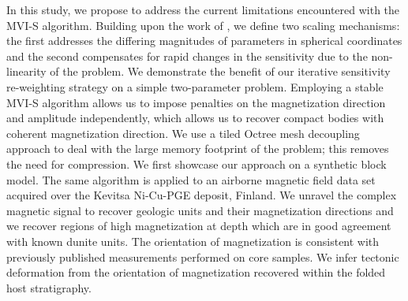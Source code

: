 \documentclass[paper]{geophysics}
\begin{document}
In this study, we propose to address the current limitations encountered with the MVI-S algorithm. Building upon the work of \cite{Liu2017}, we define two scaling mechanisms: the first addresses the differing magnitudes of parameters in spherical coordinates and the second compensates for rapid changes in the sensitivity due to the non-linearity of the problem. We demonstrate the benefit of our iterative sensitivity re-weighting strategy on a simple two-parameter problem. Employing a stable MVI-S algorithm allows us to impose penalties on the magnetization direction and amplitude independently, which allows us to recover compact bodies with coherent magnetization direction. We use a tiled Octree mesh decoupling approach to deal with the large memory footprint of the problem; this removes the need for compression. We first showcase our approach on a synthetic block model. The same algorithm is applied to an airborne magnetic field data set acquired over the Kevitsa Ni-Cu-PGE deposit, Finland. We unravel the complex magnetic signal to recover geologic units and their magnetization directions and we recover regions of high magnetization at depth which are in good agreement with known dunite units. The orientation of magnetization is consistent with  previously published measurements performed on core samples. We infer tectonic deformation from the orientation of magnetization recovered within the folded host stratigraphy.
\end{document}
